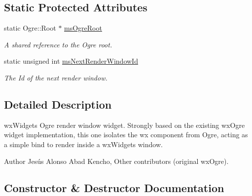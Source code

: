 \subsection*{Static Protected Attributes}
\begin{DoxyCompactItemize}
\item 
static Ogre\+::\+Root $\ast$ \mbox{\hyperlink{classwx_ogre_render_window_aeb1475a166966aa151cbfc71bb4dfe60}{ms\+Ogre\+Root}}
\begin{DoxyCompactList}\small\item\em A shared reference to the Ogre root. \end{DoxyCompactList}\item 
static unsigned int \mbox{\hyperlink{classwx_ogre_render_window_aaa86fba0799417a0148303d6613ce424}{ms\+Next\+Render\+Window\+Id}}
\begin{DoxyCompactList}\small\item\em The Id of the next render window. \end{DoxyCompactList}\end{DoxyCompactItemize}


\subsection{Detailed Description}
wx\+Widgets Ogre render window widget. Strongly based on the existing wx\+Ogre widget implementation, this one isolates the wx component from Ogre, acting as a simple bind to render inside a wx\+Widgets window.

\begin{DoxyAuthor}{Author}
Jesús Alonso Abad \textquotesingle{}Kencho\textquotesingle{}, Other contributors (original wx\+Ogre). 
\end{DoxyAuthor}


\subsection{Constructor \& Destructor Documentation}
\mbox{\label{classwx_ogre_render_window_aa1add46adc50ac203ff2b5b07e001b00}} 
